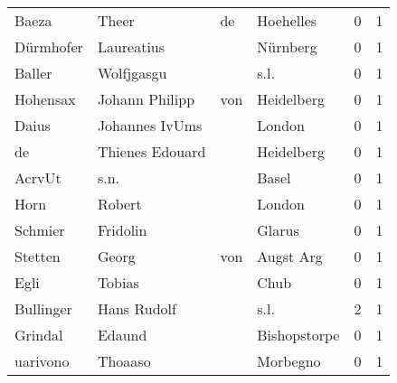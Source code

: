 \documentclass[10pt,a4paper,landscape]{article}
\begin{document}
\begin{longtable}{llllrr}
                    Baeza &                              Theer &          de &                                   Hoehelles &          0 &         1 \\
                Dürmhofer &                         Laureatius &             &                                    Nürnberg &          0 &         1 \\
                   Baller &                         Wolfjgasgu &             &                                        s.l. &          0 &         1 \\
                 Hohensax &                     Johann Philipp &         von &                                  Heidelberg &          0 &         1 \\
                    Daius &                     Johannes IvUms &             &                                      London &          0 &         1 \\
                       de &                    Thienes Edouard &             &                                  Heidelberg &          0 &         1 \\
                   AcrvUt &                               s.n. &             &                                       Basel &          0 &         1 \\
                     Horn &                             Robert &             &                                      London &          0 &         1 \\
                  Schmier &                           Fridolin &             &                                      Glarus &          0 &         1 \\
                  Stetten &                              Georg &         von &                                   Augst Arg &          0 &         1 \\
                     Egli &                             Tobias &             &                                        Chub &          0 &         1 \\
                Bullinger &                        Hans Rudolf &             &                                        s.l. &          2 &         1 \\
                  Grindal &                             Edaund &             &                                Bishopstorpe &          0 &         1 \\
                 uarivono &                            Thoaaso &             &                                    Morbegno &          0 &         1 \\

\end{longtable}
\end{document}
